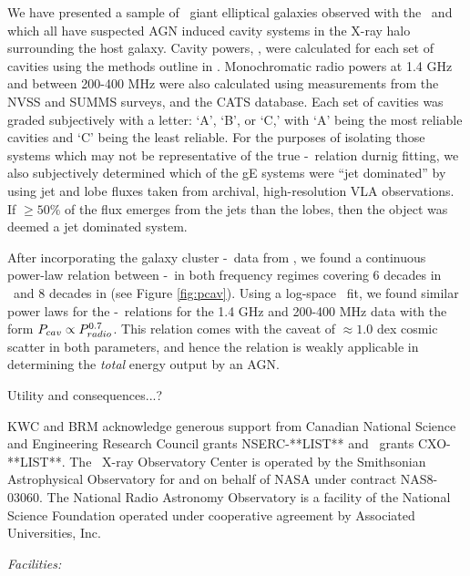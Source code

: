 \documentclass{emulateapj}
\begin{document}
We have presented a sample of \samp\ giant elliptical galaxies
observed with the \cxo\ and which all have suspected AGN induced
cavity systems in the X-ray halo surrounding the host galaxy. Cavity
powers, \pcav, were calculated for each set of cavities using the
methods outline in \citet{rafferty06}. Monochromatic radio powers at
1.4 GHz and between 200-400 MHz were also calculated using
measurements from the NVSS and SUMMS surveys, and the CATS database.
Each set of cavities was graded subjectively with a letter: `A', `B',
or `C,' with `A' being the most reliable cavities and `C' being the
least reliable. For the purposes of isolating those systems which may
not be representative of the true \pcav-\prad\ relation durnig
fitting, we also subjectively determined which of the gE systems were
``jet dominated'' by using jet and lobe fluxes taken from archival,
high-resolution VLA observations. If $\ge 50\%$ of the flux emerges
from the jets than the lobes, then the object was deemed a jet
dominated system.

After incorporating the galaxy cluster \pcav-\prad\ data from
\citep{birzan08}, we found a continuous power-law relation between
\pcav-\prad\ in both frequency regimes covering 6 decades in
\prad\ and 8 decades in \pcav (see Figure \ref{fig:pcav}). Using a
log-space \bces\ fit, we found similar power laws for the
\pcav-\prad\ relations for the 1.4 GHz and 200-400 MHz data with the
form $P_{cav} \propto P_{radio}^{0.7}$. This relation comes with the caveat
of $\approx 1.0$ dex cosmic scatter in both parameters, and hence the
relation is weakly applicable in determining the {\it{total}} energy
output by an AGN.

Utility and consequences...?

\acknowledgements

KWC and BRM acknowledge generous support from Canadian National
Science and Engineering Research Council grants NSERC-**LIST** and
\cxo\ grants CXO-**LIST**. The \chandra\ X-ray Observatory Center is
operated by the Smithsonian Astrophysical Observatory for and on
behalf of NASA under contract NAS8-03060. The National Radio Astronomy
Observatory is a facility of the National Science Foundation operated
under cooperative agreement by Associated Universities, Inc.


{\it Facilities:}  







\end{document}
